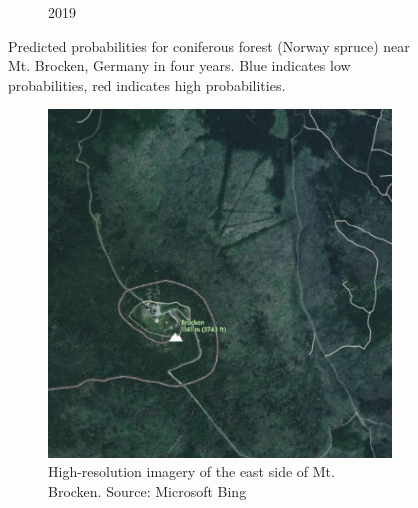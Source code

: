 \begin{figure}[H]
\begin{subfigure}[t]{0.24\textwidth}
        \caption{2019}
        \end{subfigure}
        \hfill
        \caption{Predicted probabilities for coniferous forest (Norway spruce) near Mt. Brocken, Germany in four years. Blue indicates low probabilities, red indicates high probabilities.}
        \label{fig:brocken_probabilities}
        \end{figure}

        \begin{figure}[H]
        \centering
        \begin{subfigure}[t]{0.24\textwidth}
        \centering
        \includegraphics[width=\linewidth,height=\linewidth]{figs_06/brocken_bing.png}
        \caption{High-resolution imagery of the east side of Mt. Brocken. Source: Microsoft Bing}
        \end{subfigure}
        \hfill
        \begin{subfigure}[t]{0.24\textwidth}
        \centering

\end{subfigure}
\end{figure}
